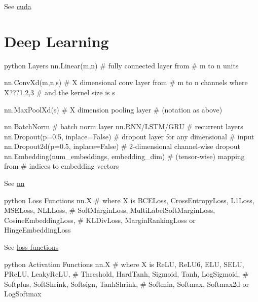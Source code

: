 \documentclass[10pt,a4paper]{article}
\begin{document}
\begin{multicols}{2}
See \href{https://pytorch.org/docs/stable/cuda.html}{cuda}

\hypertarget{deep-learning}{%
\section{Deep Learning}\label{deep-learning}}

\begin{codebox}{python}{\hypertarget{layers}{%
Layers\label{layers}}}
nn.Linear(m,n)                              # fully connected layer from
                                            # m to n units

nn.ConvXd(m,n,s)                            # X dimensional conv layer from
                                            # m to n channels where X???{1,2,3}
                                            # and the kernel size is s

nn.MaxPoolXd(s)                             # X dimension pooling layer
                                            # (notation as above)

nn.BatchNorm                                # batch norm layer
nn.RNN/LSTM/GRU                             # recurrent layers
nn.Dropout(p=0.5, inplace=False)            # dropout layer for any dimensional 
                                            # input
nn.Dropout2d(p=0.5, inplace=False)          # 2-dimensional channel-wise dropout
nn.Embedding(num_embeddings, embedding_dim) # (tensor-wise) mapping from
                                            # indices to embedding vectors
\end{codebox}

See \href{https://pytorch.org/docs/stable/nn.html}{nn}

\begin{codebox}{python}{\hypertarget{loss-functions}{%
Loss Functions\label{loss-functions}}}
nn.X                # where X is BCELoss, CrossEntropyLoss, L1Loss, MSELoss, NLLLoss, 
                    # SoftMarginLoss, MultiLabelSoftMarginLoss, CosineEmbeddingLoss,
                    # KLDivLoss, MarginRankingLoss or HingeEmbeddingLoss
\end{codebox}

See \href{https://pytorch.org/docs/stable/nn.html\#loss-functions}{loss
functions}

\begin{codebox}{python}{\hypertarget{activation-functions}{%
Activation Functions\label{activation-functions}}}
nn.X                # where X is ReLU, ReLU6, ELU, SELU, PReLU, LeakyReLU,
                    # Threshold, HardTanh, Sigmoid, Tanh, LogSigmoid, 
                    # Softplus, SoftShrink, Softsign, TanhShrink, 
                    # Softmin, Softmax, Softmax2d or LogSoftmax
\end{codebox}


\end{multicols}
\end{document}
